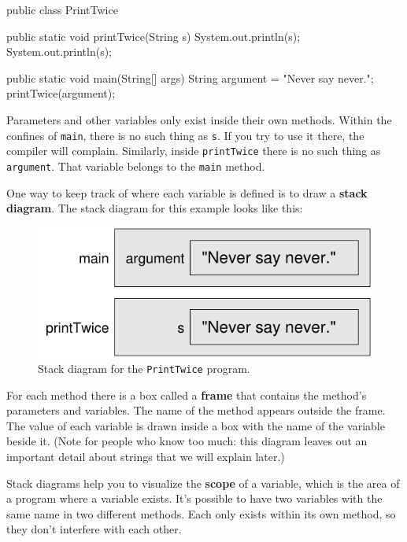 \documentclass[12pt]{book}
\theoremstyle{exercise}
\newcommand{\java}[1]{\verb"#1"}
\newcommand{\java}[1]{\lstinline{#1}} %
\begin{document}
\begin{code}
public class PrintTwice {

    public static void printTwice(String s) {
        System.out.println(s);
        System.out.println(s);
    }

    public static void main(String[] args) {
        String argument = "Never say never.";
        printTwice(argument);
    }

}
\end{code}

Parameters and other variables only exist inside their own methods.
Within the confines of \java{main}, there is no such thing as \java{s}.
If you try to use it there, the compiler will complain.
Similarly, inside \java{printTwice} there is no such thing as \java{argument}.
That variable belongs to the \java{main} method.

One way to keep track of where each variable is defined is to draw a {\bf stack diagram}.
The stack diagram for this example looks like this:

\begin{figure}[!h]
\begin{center}
\includegraphics[scale=0.9]{figs/stack.pdf}
\caption{Stack diagram for the \java{PrintTwice} program.}
\end{center}
\end{figure}


For each method there is a box called a {\bf frame} that contains the method's parameters and variables.
The name of the method appears outside the frame.
The value of each variable is drawn inside a box with the name of the variable beside it.
(Note for people who know too much: this diagram leaves out an important detail about strings that we will explain later.)


Stack diagrams help you to visualize the {\bf scope} of a variable, which is the area of a program where a variable exists.
It's possible to have two variables with the same name in two different methods.
Each only exists within its own method, so they don't interfere with each other.
\end{document}
